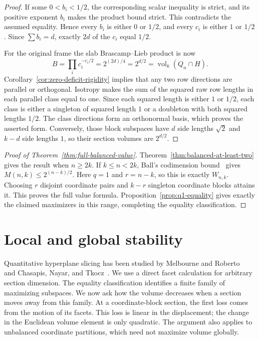 \documentclass[11pt,a4paper]{article}
\theoremstyle{remark}\newtheorem{remark}[theorem]{Remark}
\numberwithin{equation}{section}
\begin{document}
\begin{proof}
If some $0<b_i<1/2$, the corresponding scalar inequality is strict,
and its positive exponent $b_i$ makes the product bound strict.  This
contradicts the assumed equality.  Hence every $b_i$ is either $0$ or
$1/2$, and every $c_i$ is either $1$ or $1/2$.  Since $\sum b_i=d$,
exactly $2d$ of the $c_i$ equal $1/2$.

For the original frame the slab Brascamp--Lieb product is now
\[
 B=\prod_i c_i^{-c_i/2}
   =2^{(2d)/4}=2^{d/2}
   =\operatorname{vol}_k(Q_n\cap H).
\]
Corollary~\ref{cor:zero-deficit-rigidity} implies
that any two row directions are parallel or orthogonal.  Isotropy
makes the sum of the squared raw row lengths in each parallel class
equal to one.  Since each squared length is either $1$ or $1/2$, each
class is either a singleton of squared length $1$ or a doubleton with
both squared lengths $1/2$.  The class directions
form an orthonormal basis, which proves the asserted form.  Conversely,
those block subspaces have $d$ side lengths $\sqrt2$ and $k-d$ side
lengths $1$, so their section volumes are $2^{d/2}$.
\end{proof}

\begin{proof}[Proof of Theorem~\ref{thm:full-balanced-value}]
Theorem~\ref{thm:balanced-at-least-two} gives the result when $n\ge2k$. If $k\le n<2k$,
Ball's codimension bound~\cite{Ball1989} gives
$M(n,k)\le2^{(n-k)/2}$. Here $q=1$ and $r=n-k$, so this is exactly
$W_{n,k}$. Choosing $r$ disjoint coordinate pairs and $k-r$ singleton
coordinate blocks attains it. This proves the full value formula.
Proposition~\ref{prop:q1-equality} gives exactly the claimed
maximizers in this range, completing the equality classification.
\end{proof}

\section{Local and global stability}
\label{sec:stability}
Quantitative hyperplane slicing has been studied by Melbourne and
Roberto~\cite{MelbourneRoberto2022} and Chasapis, Nayar, and Tkocz~\cite{CNT2022}.
We use a direct facet calculation for arbitrary section dimension.
The equality classification identifies a finite family of maximizing
subspaces. We now ask how the volume decreases when a section moves away
from this family. At a coordinate-block section, the first loss comes
from the motion of its facets. This loss is linear in the displacement;
the change in the Euclidean volume element is only quadratic. The
argument also applies to unbalanced coordinate partitions, which need
not maximize volume globally.
\end{document}

